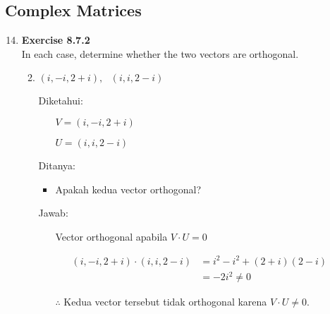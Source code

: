 \documentclass[12pt, a4paper]{scrartcl}
\begin{document}
\begin{enumerate}
\begin{enumerate}
            \end{enumerate}
        \end{enumerate}

    \pagebreak

    \subsection*{Complex Matrices}
        \begin{enumerate}
            \setcounter{enumi}{13}
            \item \textbf{Exercise 8.7.2}\\In each case, determine whether the two vectors are orthogonal.
            \begin{enumerate}
                \setcounter{enumii}{1}
                \item $(i, -i, 2+i),\mbox{ }(i, i, 2-i)$
                
                Diketahui:
                \begin{itemize}
                    \item[] $V=(i, -i, 2+i)$
                    \item[] $U=(i, i, 2-i)$
                \end{itemize}

                Ditanya:
                \begin{itemize}
                    \item Apakah kedua vector orthogonal?
                \end{itemize}

                Jawab:
                \begin{itemize}
                    \item[] Vector orthogonal apabila $V \cdot U = 0$
                \end{itemize}
                \begin{align*}
                    (i, -i, 2+i)\cdot(i, i, 2-i)&=i^2-i^2+(2+i)(2-i)
                    \\ &= -2i^2 \neq 0
                \end{align*}

                \begin{itemize}
                    \item[$\therefore$] Kedua vector tersebut tidak orthogonal karena $V \cdot U \neq 0$.
                \end{itemize}
                

\end{enumerate}
\end{enumerate}
\end{document}
